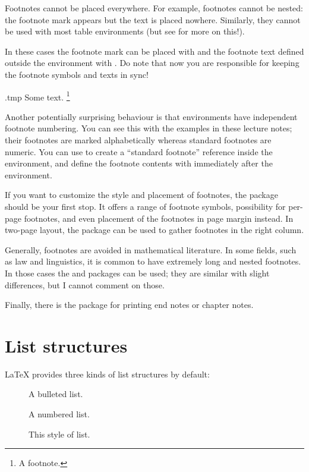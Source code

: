 Footnotes cannot be placed everywhere.
For example, footnotes cannot be nested:
the footnote mark appears but the text is placed nowhere.
Similarly, they cannot be used with most table environments
(but see  for more on this!).

In these cases the footnote mark can be placed with 
and the footnote text defined outside the environment with .
Do note that now you are responsible for keeping the footnote symbols and texts in sync!
%
\begin{VerbatimOut}{\jobname.tmp}
\renewcommand{\footnotemark}{\mpfootnotemark} %
Some text.%
\footnote{A footnote.\footnotemark}
\end{VerbatimOut}
\ShowExample[2]

Another potentially surprising behaviour is that  environments
have independent footnote numbering.
You can see this with the examples in these lecture notes;
their footnotes are marked alphabetically whereas standard footnotes are numeric.
You can use  to create a ``standard footnote'' reference inside the environment,
and define the footnote contents with  immediately after the environment.

If you want to customize the style and placement of footnotes,
the  package should be your first stop.
It offers a range of footnote symbols, possibility for per-page footnotes,
and even placement of the footnotes in page margin instead.
In two-page layout, the  package can be used to gather
footnotes in the right column.

Generally, footnotes are avoided in mathematical literature.
In some fields, such as law and linguistics,
it is common to have extremely long and nested footnotes.
In those cases the  and  packages can be used;
they are similar with slight differences, but I cannot comment on those.

Finally, there is the  package for printing end notes or chapter notes.


%
%
%
\section{List structures}\label{sec:lists}

\LaTeX{} provides three kinds of list structures by default:
\begin{description}
\item[] A bulleted list.
\item[] A numbered list.
\item[] This style of list.
\end{description}

